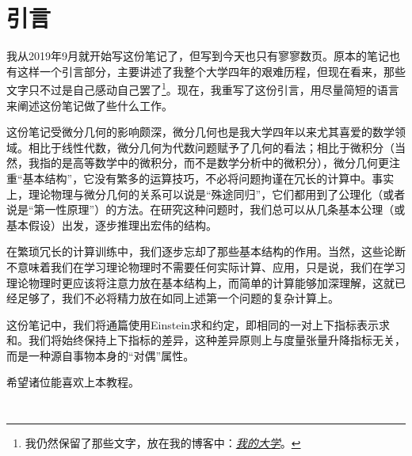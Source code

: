 \part{引言}
    我从2019年9月就开始写这份笔记了，但写到今天也只有寥寥数页。原本的笔记也有这样一个引言部分，主要讲述了我整个大学四年的艰难历程，但现在看来，那些文字只不过是自己感动自己罢了\footnote{我仍然保留了那些文字，放在我的博客中：\href{https://shunzdai.now.sh/2020/06/04/My-Life-In-College/}{\textit{我的大学}}。}。现在，我重写了这份引言，用尽量简短的语言来阐述这份笔记做了些什么工作。
	
    这份笔记受微分几何的影响颇深，微分几何也是我大学四年以来尤其喜爱的数学领域。相比于线性代数，微分几何为代数问题赋予了几何的看法；相比于微积分（当然，我指的是高等数学中的微积分，而不是数学分析中的微积分），微分几何更注重“基本结构”，它没有繁多的运算技巧，不必将问题拘谨在冗长的计算中。事实上，理论物理与微分几何的关系可以说是“殊途同归”，它们都用到了公理化（或者说是“第一性原理”）的方法。在研究这种问题时，我们总可以从几条基本公理（或基本假设）出发，逐步推理出宏伟的结构。
    
    在繁琐冗长的计算训练中，我们逐步忘却了那些基本结构的作用。当然，这些论断不意味着我们在学习理论物理时不需要任何实际计算、应用，只是说，我们在学习理论物理时更应该将注意力放在基本结构上，而简单的计算能够加深理解，这就已经足够了，我们不必将精力放在如同上述第一个问题的复杂计算上。

    这份笔记中，我们将通篇使用Einstein求和约定，即相同的一对上下指标表示求和。我们将始终保持上下指标的差异，这种差异原则上与度量张量升降指标无关，而是一种源自事物本身的“对偶”属性。

    希望诸位能喜欢上本教程。
    
    $\quad$

    $\quad$

    